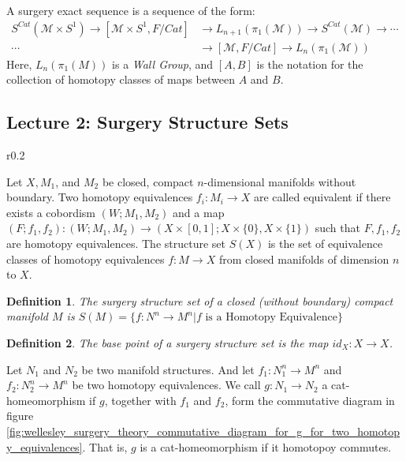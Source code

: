 \documentclass{article}
\theoremstyle{mystyle}
\newtheorem{definition}{Definition}[section]
\begin{document}
A surgery exact sequence is a sequence of the form:
\begin{align*}
    S^{Cat}(\mathcal{M}\times S^{1}) \rightarrow [\mathcal{M}\times S^{1},F/Cat] &\rightarrow L_{n+1}(\pi_{1}(\mathcal{M})) \rightarrow S^{Cat}(\mathcal{M}) \rightarrow \cdots\\
    \cdots &\rightarrow [\mathcal{M},F/Cat] \rightarrow L_{n}(\pi_{1}(\mathcal{M}))
\end{align*}
Here, $L_{n}(\pi_{1}(M))$ is a \textit{Wall Group}, and $[A,B]$ is the notation for the collection of homotopy classes of maps between $A$ and $B$.
\subsection{Lecture 2: Surgery Structure Sets}
\begin{wrapfigure}[6]{r}{0.2\textwidth}
\vspace{-6ex}
\centering
{}
\caption[Surgery Theory Commutative Diagram]{Commutative Diagram for $g$}
\label{fig:wellesley_surgery_theory_commutative_diagram_for_g_for_two_homotopy_equivalences}
\end{wrapfigure}
Let $X,M_{1}$, and $M_{2}$ be closed, compact $n$-dimensional manifolds without boundary. Two homotopy equivalences $f_{i}:M_{i}\rightarrow X$ are called equivalent if there exists a cobordism $(W;M_{1},M_{2})$ and a map $(F;f_{1},f_{2}):(W;M_{1},M_{2})\rightarrow (X\times [0,1];X\times \{0\},X\times\{1\})$ such that $F,f_{1},f_{2}$ are homotopy equivalences. The structure set $S(X)$ is the set of equivalence classes of homotopy equivalences $f:M\rightarrow X$ from closed manifolds of dimension $n$ to $X$.\hfill
\begin{definition}
The surgery structure set of a closed (without boundary) compact manifold $M$ is $S(M) = \{f:N^{n}\rightarrow M^{n}|f\textrm{ is a Homotopy Equivalence}\}$
\end{definition}
\begin{definition}
The base point of a surgery structure set is the map $id_{X}:X\rightarrow X$.
\end{definition}
Let $N_{1}$ and $N_{2}$ be two manifold structures. And let $f_{1}:N_{1}^{n}\rightarrow M^{n}$ and $f_{2}:N_{2}^{n}\rightarrow M^{n}$ be two homotopy equivalences. We call $g:N_{1}\rightarrow N_{2}$ a cat-homeomorphism if $g$, together with $f_{1}$ and $f_{2}$, form the commutative diagram in figure \ref{fig:wellesley_surgery_theory_commutative_diagram_for_g_for_two_homotopy_equivalences}. That is, $g$ is a cat-homeomorphism if it homotopoy commutes.
\end{document}
